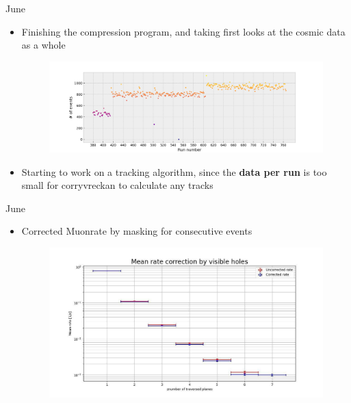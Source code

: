 \documentclass{beamer}
\begin{document}
\begin{frame}{June}
    \begin{itemize}
	\item Finishing the compression program, and taking first looks at the
	    cosmic data as a whole
	    \begin{figure}[H]
		\centering
		\includegraphics[width=.9\textwidth]{MauriceFirstLookCosmics.png}
	    \end{figure}
	\item Starting to work on a tracking algorithm, since the \textbf{data per run} 
	    is too small for corryvreckan to calculate any tracks
    \end{itemize}
\end{frame}

\begin{frame}{June}
    \begin{itemize}
	\item Corrected Muonrate by masking for consecutive events
	    \begin{figure}[H]
		\centering
		\includegraphics[width=.9\textwidth]{DavidCorrection.jpg}
	    \end{figure}
    \end{itemize}
\end{frame}
\end{document}
